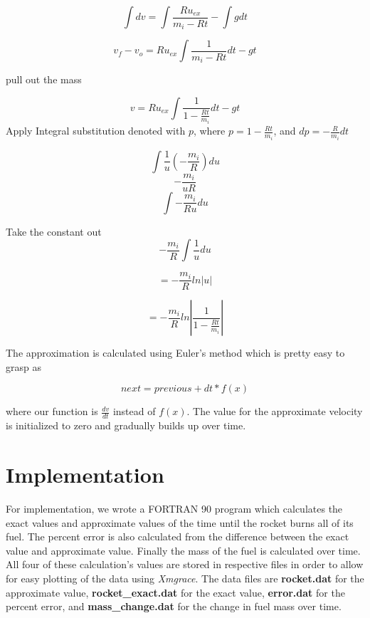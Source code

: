\documentclass[11pt]{article}
\begin{document}
\begin{equation}
\int{dv} = \int{\frac{Ru_{ex}}{m_i-Rt}} - \int{g dt}
\end{equation}

\begin{equation}
v_f-v_o = Ru_{ex}\int{\frac{1}{m_i-Rt}}dt - gt
\end{equation}

pull out the mass

\begin{equation}
v = Ru_{ex}\int{\frac{1}{1-\frac{Rt}{m_i}}}dt - gt
\end{equation}
Apply Integral substitution denoted with $p$, where
$p = 1-\frac{Rt}{m_i}$, and
$dp = - \frac{R}{m_i}dt$

\begin{equation}
\int{\frac{1}{u}(-\frac{m_i}{R})du}
\end{equation}
\begin{equation}
- \frac{m_i}{uR}
\end{equation}
\begin{equation}
\int{-\frac{m_i}{Ru} du}
\end{equation}

Take the constant out
\begin{equation}
-\frac{m_i}{R} \int{\frac{1}{u}du}
\end{equation}

\begin{equation}
= -\frac{m_i}{R}ln|u|
\end{equation}

\begin{equation}
= -\frac{m_i}{R}ln|\frac{1}{1-\frac{Rt}{m_i}}|
\end{equation}

The approximation is calculated using Euler's method which is pretty easy to grasp as

\begin{equation}
next = previous + dt * f(x)
\end{equation}

\noindent where our function is $\frac{dv}{dt}$ instead of $f(x)$. The value for the approximate velocity is initialized to zero and gradually builds up over time.


\section{Implementation}
For implementation, we wrote a FORTRAN 90 program which calculates the exact values and approximate values of the time until the rocket burns all of its fuel. The percent error is also calculated from the difference between the exact value and approximate value. Finally the mass of the fuel is calculated over time. All four of these calculation's values are stored in respective files in order to allow for easy plotting of the data using \textit{Xmgrace}. The data files are \textbf{rocket.dat} for the approximate value, \textbf{rocket\_exact.dat} for the exact value, \textbf{error.dat} for the percent error, and \textbf{mass\_change.dat} for the change in fuel mass over time.\\
\end{document}
